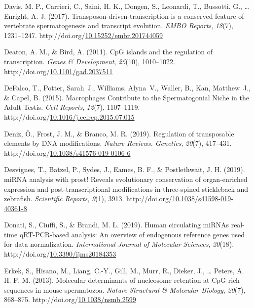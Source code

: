 \documentclass[12pt,twoside]{reedthesis}
\newlength{\cslhangindent}
\newenvironment{CSLReferences}[2] %
 {%
  \setlength{\parindent}{0pt}
  \ifodd #1 \everypar{\setlength{\hangindent}{\cslhangindent}}\ignorespaces\fi
  \ifnum #2 > 0
  \setlength{\parskip}{#2\baselineskip}
  \fi
 }%
 {}
\begin{document}
\begin{CSLReferences}{1}{0}
\leavevmode{}%
Davis, M. P., Carrieri, C., Saini, H. K., Dongen, S., Leonardi, T., Bussotti, G., \ldots{} Enright, A. J. (2017). Transposon{-}driven transcription is a conserved feature of vertebrate spermatogenesis and transcript evolution. \emph{EMBO Reports}, \emph{18}(7), 1231--1247. http://doi.org/\href{https://doi.org/10.15252/embr.201744059}{10.15252/embr.201744059}

\leavevmode{}%
Deaton, A. M., \& Bird, A. (2011). CpG islands and the regulation of transcription. \emph{Genes \& Development}, \emph{25}(10), 1010--1022. http://doi.org/\href{https://doi.org/10.1101/gad.2037511}{10.1101/gad.2037511}

\leavevmode{}%
DeFalco, T., Potter, Sarah~J., Williams, Alyna~V., Waller, B., Kan, Matthew~J., \& Capel, B. (2015). Macrophages Contribute to the Spermatogonial Niche in the Adult Testis. \emph{Cell Reports}, \emph{12}(7), 1107--1119. http://doi.org/\href{https://doi.org/10.1016/j.celrep.2015.07.015}{10.1016/j.celrep.2015.07.015}

\leavevmode{}%
Deniz, Ö., Frost, J. M., \& Branco, M. R. (2019). Regulation of transposable elements by DNA modifications. \emph{Nature Reviews. Genetics}, \emph{20}(7), 417--431. http://doi.org/\href{https://doi.org/10.1038/s41576-019-0106-6}{10.1038/s41576-019-0106-6}

\leavevmode{}%
Desvignes, T., Batzel, P., Sydes, J., Eames, B. F., \& Postlethwait, J. H. (2019). miRNA analysis with prost! Reveals evolutionary conservation of organ-enriched expression and post-transcriptional modifications in three-spined stickleback and zebrafish. \emph{Scientific Reports}, \emph{9}(1), 3913. http://doi.org/\href{https://doi.org/10.1038/s41598-019-40361-8}{10.1038/s41598-019-40361-8}

\leavevmode{}%
Donati, S., Ciuffi, S., \& Brandi, M. L. (2019). Human circulating miRNAs real-time qRT-PCR-based analysis: An overview of endogenous reference genes used for data normalization. \emph{International Journal of Molecular Sciences}, \emph{20}(18). http://doi.org/\href{https://doi.org/10.3390/ijms20184353}{10.3390/ijms20184353}

\leavevmode{}%
Erkek, S., Hisano, M., Liang, C.-Y., Gill, M., Murr, R., Dieker, J., \ldots{} Peters, A. H. F. M. (2013). Molecular determinants of nucleosome retention at CpG-rich sequences in mouse spermatozoa. \emph{Nature Structural \& Molecular Biology}, \emph{20}(7), 868--875. http://doi.org/\href{https://doi.org/10.1038/nsmb.2599}{10.1038/nsmb.2599}


\end{CSLReferences}
\end{document}
